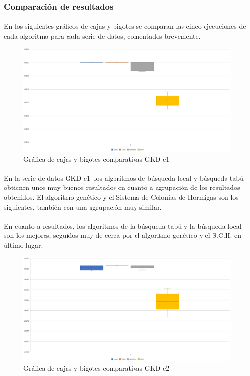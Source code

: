 	\subsubsection{Comparación de resultados}
	
	\paragraph{}En los siguientes gráficos de cajas y bigotes se comparan las cinco ejecuciones de cada algoritmo para cada serie de datos, comentados brevemente.
	
	\begin{figure}[H]
		\centering
		\includegraphics[scale=0.3]{img/finalGKD1.png}
		\caption{Gráfica de cajas y bigotes comparativas GKD-c1}
		\label{GKD-c1_final}
	\end{figure}

	\paragraph{}En la serie de datos GKD-c1, los algoritmos de búsqueda local y búsqueda tabú obtienen unos muy buenos resultados en cuanto a agrupación de los resultados obtenidos. El algoritmo genético y el Sistema de Colonias de Hormigas son los siguientes, también con una agrupación muy similar.
	
	\paragraph{}En cuanto a resultados, los algoritmos de la búsqueda tabú y la búsqueda local son los mejores, seguidos muy de cerca por el algoritmo genético y el S.C.H. en último lugar.

	\begin{figure}[H]
		\centering
		\includegraphics[scale=0.3]{img/finalGKD2.png}
		\caption{Gráfica de cajas y bigotes comparativas GKD-c2}
		\label{GKD-c2_final}
	\end{figure}

